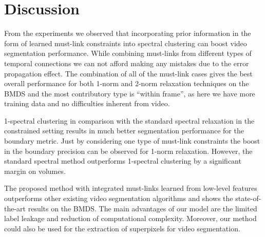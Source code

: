 \section{Discussion}
\label{ch5:disc}
From the experiments we observed that incorporating prior information in the form of learned must-link constraints into spectral clustering can boost video segmentation performance.
While combining must-links from different types of temporal connections we can not afford making any mistakes due to the error propagation effect.
The combination of all of the must-link cases gives the best overall performance for both 1-norm and 2-norm relaxation techniques on the BMDS and the most contributory type is ``within frame'', 
as here we have more training data and no difficulties inherent from video. 

1-spectral clustering in comparison with the standard spectral relaxation in the constrained setting results in much better segmentation performance for the boundary metric.
Just by considering one type of must-link constraints the boost in the boundary precision can be observed for 1-norm relaxation. However,
the standard spectral method outperforms 1-spectral clustering by a significant margin on volumes.

The proposed method with integrated must-links learned from low-level features outperforms other existing video segmentation algorithms and shows the state-of-the-art results
on the BMDS.
The main advantages of our model are the limited label leakage and reduction of computational complexity.
Moreover, our method could also be used for the extraction of superpixels for video segmentation. 
